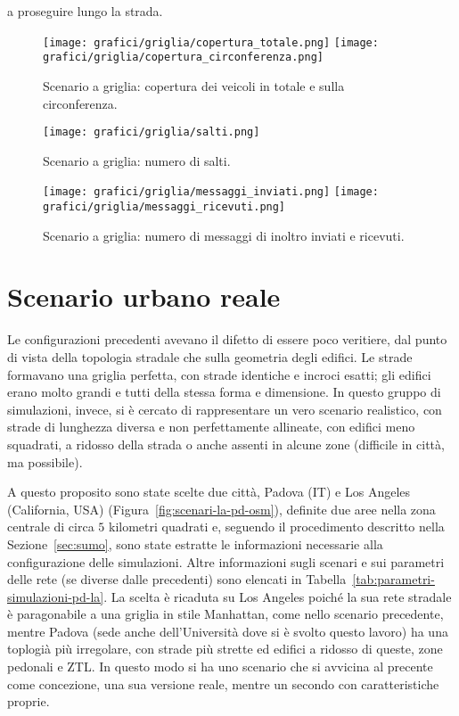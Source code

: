 a proseguire lungo la strada.
%
\begin{figure}[htbp]
	\centering
		\texttt{[image: grafici/griglia/copertura\_totale.png]}
		\texttt{[image: grafici/griglia/copertura\_circonferenza.png]}
\caption{Scenario a griglia: copertura dei veicoli in totale e sulla circonferenza.\label{fig:risultati-griglia-copertura}}
\end{figure}
%
\begin{figure}[htbp]
	\centering
		\texttt{[image: grafici/griglia/salti.png]}
\caption{Scenario a griglia: numero di salti.\label{fig:risultati-griglia-salti}}
\end{figure}
%
\begin{figure}[htbp]
	\centering
		\texttt{[image: grafici/griglia/messaggi\_inviati.png]}
		\texttt{[image: grafici/griglia/messaggi\_ricevuti.png]}
\caption{Scenario a griglia: numero di messaggi di inoltro inviati e ricevuti.\label{fig:risultati-griglia-messaggi}}
\end{figure}
\clearpage
%
%
\section{Scenario urbano reale} %
Le configurazioni precedenti avevano il difetto di essere poco veritiere, dal punto di vista della topologia stradale
che sulla geometria degli edifici.
Le strade formavano una griglia perfetta, con strade identiche e incroci esatti;
gli edifici erano molto grandi e tutti della stessa forma e dimensione.
In questo gruppo di simulazioni, invece, si è cercato di rappresentare un vero scenario realistico,
con strade di lunghezza diversa e non perfettamente allineate,
con edifici meno squadrati, a ridosso della strada o anche assenti in alcune zone (difficile in città, ma possibile).

A questo proposito sono state scelte due città, Padova (IT) e Los Angeles (California, USA) (Figura~\ref{fig:scenari-la-pd-osm}), definite due aree nella zona centrale di circa $5$ kilometri quadrati
e, seguendo il procedimento descritto nella Sezione~\ref{sec:sumo}, sono state estratte le informazioni necessarie alla configurazione delle simulazioni.
Altre informazioni sugli scenari e sui parametri delle rete (se diverse dalle precedenti) sono elencati in Tabella~\ref{tab:parametri-simulazioni-pd-la}.
La scelta è ricaduta su Los Angeles poiché la sua rete stradale è paragonabile a una griglia in stile Manhattan, come nello scenario precedente,
mentre Padova (sede anche dell'Università dove si è svolto questo lavoro) ha una toplogià più irregolare, con strade più strette ed edifici a ridosso di queste,
zone pedonali e ZTL.
In questo modo si ha uno scenario che si avvicina al precente come concezione,
una sua versione reale, mentre un secondo con caratteristiche proprie.

